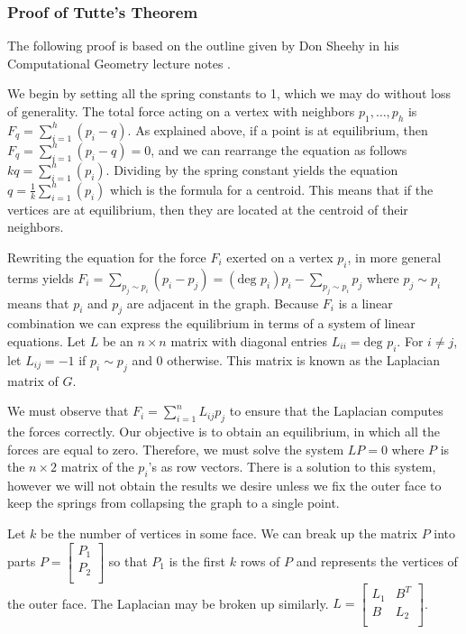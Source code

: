 \documentclass[11pt]{article}
\theoremstyle{definition}
\begin{document}
\subsubsection{Proof of Tutte's Theorem}
	The following proof is based on the outline given by Don Sheehy in his Computational Geometry lecture notes \cite{donTutte}.
	
	We begin by setting all the spring constants to 1, which we may do without loss of generality.		
	The total force acting on a vertex with neighbors $p_1, \dots, p_h$ is $F_q = \sum_{i=1}^{h}(p_i - q)$. 
	As explained above, if a point is at equilibrium, then $F_q = \sum_{i=1}^{h}(p_i - q) = 0$, and we can rearrange the equation as follows $kq = \sum_{i=1}^{h}(p_i)$. 
	Dividing by the spring constant yields the equation $q = \frac{1}{k}\sum_{i=1}^{h}(p_i)$ which is the formula for a centroid.
	This means that if the vertices are at equilibrium, then they are located at the centroid of their neighbors.
	
	Rewriting the equation for the force $F_i$ exerted on a vertex $p_i$, in more general terms yields $F_i = \sum_{p_j \sim p_i} (p_i-p_j) = (\text{deg } p_i)p_i - \sum_{p_j \sim p_i}p_j$ where $p_j \sim p_i$ means that $p_i$ and $p_j$ are adjacent in the graph.
	Because $F_i$ is a linear combination we can express the equilibrium in terms of a system of linear equations. 
	Let $L$ be an $n \times n$ matrix with diagonal entries $L_{ii} = \text{deg }p_i$. For $i \neq j$, let $L_{ij} = -1$ if $p_i \sim p_j$ and 0 otherwise.
	This matrix is known as the Laplacian matrix of $G$.
	
	We must observe that $F_i = \sum_{i =1}^{n}L_{ij}p_j$ to ensure that the Laplacian computes the forces correctly. 
	Our objective is to obtain an equilibrium, in which all the forces are equal to zero. 
	Therefore, we must solve the system $LP = 0$ where $P$ is the $n \times 2$ matrix of the $p_i$'s as row vectors. 
	There is a solution to this system, however we will not obtain the results we desire unless we fix the outer face to keep the springs from collapsing the graph to a single point. 
	
	Let $k$ be the number of vertices in some face. We can break up the matrix $P$ into parts $P = 
		\begin{bmatrix}
    			P_1 \\
    			P_2 \\
		\end{bmatrix} $ 
	so that $P_1$ is the first $k$ rows of $P$ and represents the vertices of the outer face. The Laplacian may be broken up similarly. $L = 
		\begin{bmatrix}
			L_1 & B^T \\
			B & L_2 \\
		\end{bmatrix}$. 
		
\end{document}
